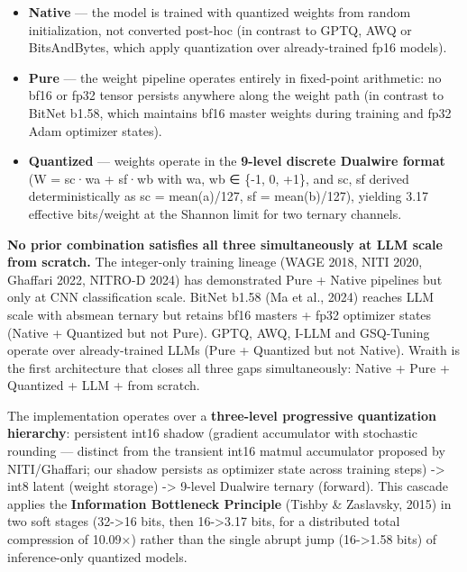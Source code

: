 \begin{itemize}
\tightlist
\item
  \textbf{Native} --- the model is trained with quantized weights from
  random initialization, not converted post-hoc (in contrast to GPTQ,
  AWQ or BitsAndBytes, which apply quantization over already-trained
  fp16 models).
\item
  \textbf{Pure} --- the weight pipeline operates entirely in fixed-point
  arithmetic: no bf16 or fp32 tensor persists anywhere along the weight
  path (in contrast to BitNet b1.58, which maintains bf16 master weights
  during training and fp32 Adam optimizer states).
\item
  \textbf{Quantized} --- weights operate in the \textbf{9-level discrete
  Dualwire format} (W = sc·wa + sf·wb with wa, wb ∈ \{-1, 0, +1\}, and
  sc, sf derived deterministically as sc = mean(\textbar a\textbar)/127,
  sf = mean(\textbar b\textbar)/127), yielding 3.17 effective
  bits/weight at the Shannon limit for two ternary channels.
\end{itemize}

\textbf{No prior combination satisfies all three simultaneously at LLM
scale from scratch.} The integer-only training lineage (WAGE 2018, NITI
2020, Ghaffari 2022, NITRO-D 2024) has demonstrated Pure + Native
pipelines but only at CNN classification scale. BitNet b1.58 (Ma et al.,
2024) reaches LLM scale with absmean ternary but retains bf16 masters +
fp32 optimizer states (Native + Quantized but not Pure). GPTQ, AWQ,
I-LLM and GSQ-Tuning operate over already-trained LLMs (Pure + Quantized
but not Native). Wraith is the first architecture that closes all three
gaps simultaneously: Native + Pure + Quantized + LLM + from scratch.

The implementation operates over a \textbf{three-level progressive
quantization hierarchy}: persistent int16 shadow (gradient accumulator
with stochastic rounding --- distinct from the transient int16 matmul
accumulator proposed by NITI/Ghaffari; our shadow persists as optimizer
state across training steps) -> int8 latent (weight storage) -> 9-level
Dualwire ternary (forward). This cascade applies the \textbf{Information
Bottleneck Principle} (Tishby \& Zaslavsky, 2015) in two soft stages
(32->16 bits, then 16->3.17 bits, for a distributed total compression of
10.09×) rather than the single abrupt jump (16->1.58 bits) of
inference-only quantized models.

